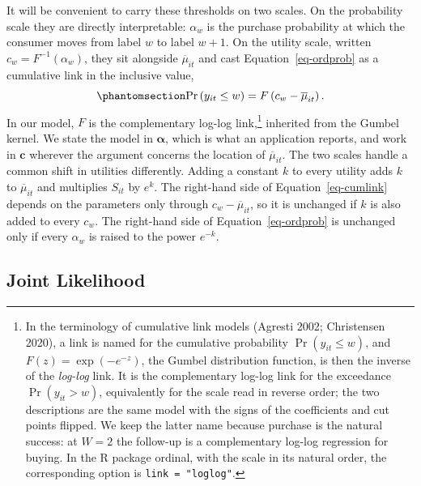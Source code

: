 \documentclass[
  letterpaper,
  DIV=11,
  numbers=noendperiod]{scrartcl}
\theoremstyle{plain}
\theoremstyle{plain}
\theoremstyle{plain}
\theoremstyle{remark}
\begin{document}
It will be convenient to carry these thresholds on two scales. On the
probability scale they are directly interpretable: \(\alpha_w\) is the
purchase probability at which the consumer moves from label \(w\) to
label \(w+1\). On the utility scale, written \(c_w = F^{-1}(\alpha_w)\),
they sit alongside \(\overline{\mu}_{it}\) and cast
Equation~\ref{eq-ordprob} as a cumulative link in the inclusive value,
\begin{equation}\protect\phantomsection\label{eq-cumlink}{
\Pr \left( y_{it} \le w \right) = F \left( c_w - \overline{\mu}_{it} \right).
}\end{equation} In our model, \(F\) is the complementary log-log
link,\footnote{In the terminology of cumulative link models (Agresti
  2002; Christensen 2020), a link is named for the cumulative
  probability \(\Pr\left( y_{it} \le w \right)\), and
  \(F(z) = \exp\left( -e^{-z} \right)\), the Gumbel distribution
  function, is then the inverse of the \emph{log-log} link. It is the
  complementary log-log link for the exceedance
  \(\Pr\left( y_{it} > w \right)\), equivalently for the scale read in
  reverse order; the two descriptions are the same model with the signs
  of the coefficients and cut points flipped. We keep the latter name
  because purchase is the natural success: at \(W = 2\) the follow-up is
  a complementary log-log regression for buying. In the R package
  ordinal, with the scale in its natural order, the corresponding option
  is \texttt{link\ =\ "loglog"}.} inherited from the Gumbel kernel. We
state the model in \(\boldsymbol{\alpha}\), which is what an application
reports, and work in \(\mathbf{c}\) wherever the argument concerns the
location of \(\overline{\mu}_{it}\). The two scales handle a common
shift in utilities differently. Adding a constant \(k\) to every utility
adds \(k\) to \(\overline{\mu}_{it}\) and multiplies \(S_{it}\) by
\(e^{k}\). The right-hand side of Equation~\ref{eq-cumlink} depends on
the parameters only through \(c_w - \overline{\mu}_{it}\), so it is
unchanged if \(k\) is also added to every \(c_w\). The right-hand side
of Equation~\ref{eq-ordprob} is unchanged only if every \(\alpha_w\) is
raised to the power \(e^{-k}\).

\subsection{Joint Likelihood}\label{joint-likelihood}
\end{document}
